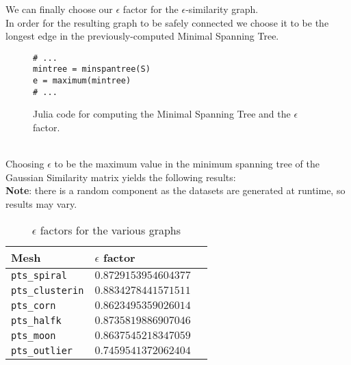 \documentclass[unicode,11pt,a4paper,oneside,numbers=endperiod,openany]{scrartcl}
\begin{document}
We can finally choose our $\epsilon$ factor for the $\epsilon$-similarity graph. \\
In order for the resulting graph to be safely connected we choose it to be the longest edge in the previously-computed Minimal Spanning Tree.
\begin{figure}[h!]
\begin{verbatim}
# ...
mintree = minspantree(S)
e = maximum(mintree)
# ...
\end{verbatim}
\caption{Julia code for computing the Minimal Spanning Tree and the $\epsilon$ factor.}
\end{figure}\\
Choosing $\epsilon$ to be the maximum value in the minimum spanning tree of the Gaussian Similarity matrix yields the following results:\\
\textbf{Note}: there is a random component as the datasets are generated at runtime, so results may vary.
\begin{table}[h!]
    \centering
    \begin{tabular}{l|ll}
        Mesh & $\epsilon$ factor \\
        \hline
        \verb|pts_spiral| & $0.8729153954604377$ \\ 
        \verb|pts_clusterin| & $0.8834278441571511$ \\
        \verb|pts_corn| & $0.8623495359026014$ \\
        \verb|pts_halfk| & $0.8735819886907046$ \\
        \verb|pts_moon| & $0.8637545218347059$ \\
        \verb|pts_outlier| & $0.7459541372062404$ \\
    \end{tabular}
    \caption{$\epsilon$ factors for the various graphs}
\end{table}


\clearpage
\end{document}
